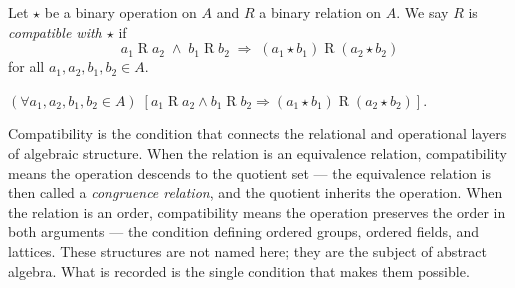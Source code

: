 \begin{tcolorbox}[colback=propbox, colframe=propborder, arc=2pt,
  left=6pt, right=6pt, top=4pt, bottom=4pt,
  title={\small\textbf{Definition (Compatibility of a Relation with an Operation)}},
  fonttitle=\small\bfseries]
\label{def:compatibility}
Let $\star$ be a binary operation on $A$ and $R$ a binary relation on $A$.
We say $R$ is \emph{compatible with $\star$} if
\[
  a_1 \mathrel{R} a_2 \;\land\; b_1 \mathrel{R} b_2
  \;\Rightarrow\;
  (a_1 \star b_1) \mathrel{R} (a_2 \star b_2)
\]
for all $a_1, a_2, b_1, b_2 \in A$.
\end{tcolorbox}

\begin{remark}
$(\forall a_1, a_2, b_1, b_2 \in A)\;
[a_1 \mathrel{R} a_2 \land b_1 \mathrel{R} b_2
\Rightarrow (a_1 \star b_1) \mathrel{R} (a_2 \star b_2)]$.
\end{remark}

\begin{remark}
Compatibility is the condition that connects the relational and operational
layers of algebraic structure.
When the relation is an equivalence relation, compatibility means the
operation descends to the quotient set — the equivalence relation is then
called a \emph{congruence relation}, and the quotient inherits the operation.
When the relation is an order, compatibility means the operation preserves
the order in both arguments — the condition defining ordered groups,
ordered fields, and lattices.
These structures are not named here; they are the subject of abstract algebra.
What is recorded is the single condition that makes them possible.
\end{remark}